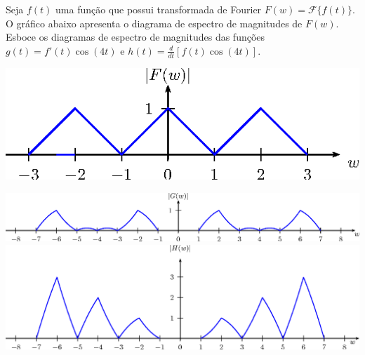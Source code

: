 \begin{exer} Seja $f(t)$ uma função que possui transformada de Fourier $F(w)=\mathcal{F}\{f(t)\}$. O gráfico abaixo apresenta o diagrama de espectro de magnitudes de $F(w)$. Esboce os diagramas de espectro de magnitudes das funções $g(t)=f'(t)\cos(4t)$ e $h(t)=\frac{d}{dt}\left[f(t)\cos(4t)\right]$.

    \begin{center}
        \includegraphics{cap_propriedades_transformada/pics/diagrama_7A}
    \end{center}
\end{exer}

\begin{resp}
    \begin{center}
    \includegraphics{cap_propriedades_transformada/pics/diagrama_7A_resp_1}\\
    \includegraphics{cap_propriedades_transformada/pics/diagrama_7A_resp_2}
    \end{center}
\end{resp}
           
    

